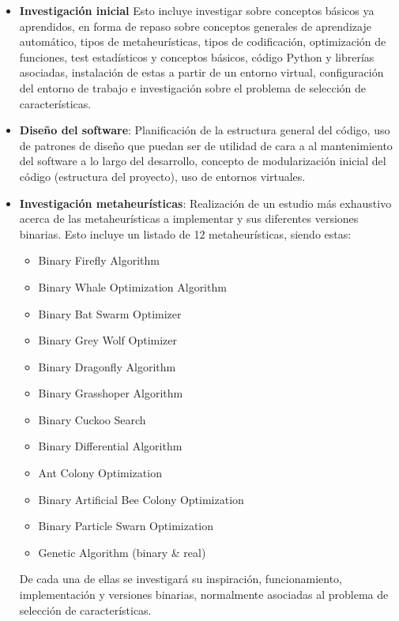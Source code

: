 \begin{itemize}
      \item \textbf{Investigación inicial}
            Esto incluye investigar sobre conceptos básicos ya aprendidos, en forma de repaso sobre conceptos generales de aprendizaje automático, tipos de metaheurísticas, tipos de codificación, optimización de funciones, test estadísticos y conceptos básicos, código Python y librerías asociadas, instalación de estas a partir de un entorno virtual, configuración del entorno de trabajo e investigación sobre el problema de selección de características.

      \item \textbf{Diseño del software}: Planificación de la estructura general del código, uso de patrones de diseño que puedan ser de utilidad de cara a al mantenimiento del software a lo largo del desarrollo, concepto de modularización inicial del código (estructura del proyecto), uso de entornos virtuales.
      \item \textbf{Investigación metaheurísticas}: Realización de un estudio más exhaustivo acerca de las metaheurísticas a implementar y sus diferentes versiones binarias. Esto incluye un listado de 12 metaheurísticas, siendo estas:
            \begin{itemize}
                  \item Binary Firefly Algorithm
                  \item Binary Whale Optimization Algorithm
                  \item Binary Bat Swarm Optimizer
                  \item Binary Grey Wolf Optimizer
                  \item Binary Dragonfly Algorithm
                  \item Binary Grasshoper Algorithm
                  \item Binary Cuckoo Search
                  \item Binary Differential Algorithm
                  \item Ant Colony Optimization
                  \item Binary Artificial Bee Colony Optimization
                  \item Binary Particle Swarn Optimization
                  \item Genetic Algorithm (binary \& real)
            \end{itemize}
            De cada una de ellas se investigará su inspiración, funcionamiento, implementación y versiones binarias, normalmente asociadas al problema de selección de características.

\end{itemize}
